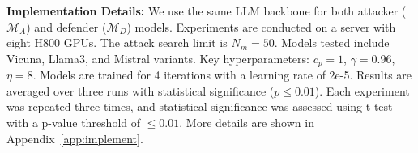 \documentclass[11pt]{article}
\def\attackmethod{GS-MCTS}
\begin{document}


 

 
\noindent\textbf{Implementation Details:} We use the same LLM backbone for both attacker (\(\mathcal{M}_{A}\)) and defender (\(\mathcal{M}_{D}\)) models. Experiments are conducted on a server with eight H800 GPUs. The attack search limit is \(N_m=50\). Models tested include Vicuna, Llama3, and Mistral variants. Key hyperparameters: \(c_p=1\), \(\gamma=0.96\), \(\eta=8\). Models are trained for 4 iterations with a learning rate of 2e-5. Results are averaged over three runs with statistical significance (\(p \leq 0.01\)). Each experiment was repeated three times, and statistical significance was assessed using t-test with a p-value threshold of $\leq 0.01$. More details are shown in Appendix~\ref{app:implement}.

 
\end{document}
